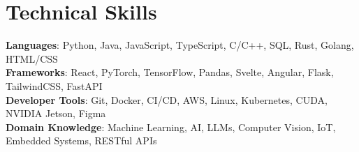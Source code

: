 \documentclass[letterpaper,11pt]{article}
\begin{document}
\section{Technical Skills}
 \begin{itemize}[leftmargin=0.15in, label={}]
    \small{\item{
     \textbf{Languages}{: Python, Java, JavaScript, TypeScript, C/C++, SQL, Rust, Golang, HTML/CSS} \\
     \textbf{Frameworks}{: React, PyTorch, TensorFlow, Pandas, Svelte, Angular, Flask, TailwindCSS, FastAPI} \\
     \textbf{Developer Tools}{: Git, Docker, CI/CD, AWS, Linux, Kubernetes, CUDA, NVIDIA Jetson, Figma} \\
     \textbf{Domain Knowledge}{: Machine Learning, AI, LLMs, Computer Vision, IoT, Embedded Systems, RESTful APIs}
    }}
 \end{itemize}

\end{document}

